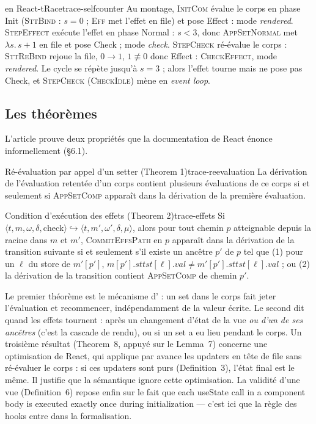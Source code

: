 \begin{exemple}{ en React-tRace}{trace-selfcounter}
Au montage, \textsc{InitCom} évalue le corps en phase \textsf{Init}
(\textsc{SttBind} : $s = 0$ ; \textsc{Eff} met l'effet en file) et pose
\textsf{Effect} : mode \emph{rendered}. \textsc{StepEffect} exécute l'effet en
phase \textsf{Normal} : $s < 3$, donc \textsc{AppSetNormal} met
$\lambda s.\,s+1$ en file et pose \textsf{Check} ; mode \emph{check}.
\textsc{StepCheck} ré-évalue le corps : \textsc{SttReBind} rejoue la file,
$0 \to 1$, $1 \not\equiv 0$ donc \textsf{Effect} : \textsc{CheckEffect}, mode
\emph{rendered}. Le cycle se répète jusqu'à $s = 3$ ; alors l'effet tourne mais
ne pose pas \textsf{Check}, et \textsc{StepCheck} (\textsc{CheckIdle}) mène en
\emph{event loop}.
\end{exemple}

\subsection{Les théorèmes}

L'article prouve deux propriétés que la documentation de React énonce
informellement (§6.1).

\begin{theoreme}{Ré-évaluation par appel d'un setter (Theorem 1)}{trace-reevaluation}
La dérivation de l'évaluation retentée d'un corps contient plusieurs évaluations
de ce corps si et seulement si \textsc{AppSetComp} apparaît dans la dérivation
de la première évaluation.
\end{theoreme}

\begin{theoreme}{Condition d'exécution des effets (Theorem 2)}{trace-effets}
Si $\langle t, m, \omega, \delta, \text{check}\rangle \hookrightarrow
\langle t, m', \omega', \delta, \mu\rangle$, alors pour tout chemin $p$
atteignable depuis la racine dans $m$ et $m'$, \textsc{CommitEffsPath} en $p$
apparaît dans la dérivation de la transition suivante si et seulement s'il
existe un ancêtre $p'$ de $p$ tel que (1) pour un $\ell$ du store de $m'[p']$,
$m[p'].\mathit{sttst}[\ell].\mathit{val} \neq m'[p'].\mathit{sttst}[\ell].\mathit{val}$ ;
ou (2) la dérivation de la transition contient \textsc{AppSetComp} de chemin
$p'$.
\end{theoreme}

Le premier théorème est le mécanisme d' : un set dans le corps fait
jeter l'évaluation et recommencer, indépendamment de la valeur écrite. Le
second dit quand les effets tournent : après un changement d'état de la vue
\emph{ou d'un de ses ancêtres} (c'est la cascade de rendu), ou si un set a eu
lieu pendant le corps. Un troisième résultat (Theorem~8, appuyé sur le
Lemma~7) concerne une optimisation de React, qui applique par avance les
updaters en tête de file sans ré-évaluer le corps : si ces updaters sont purs
(Definition~3), l'état final est le même. Il justifie que la sémantique ignore
cette optimisation. La validité d'une vue (Definition~6) repose enfin sur le
fait que \og each useState call in a component body is executed exactly once
during initialization\fg{} --- c'est ici que la règle des hooks entre dans la
formalisation.

